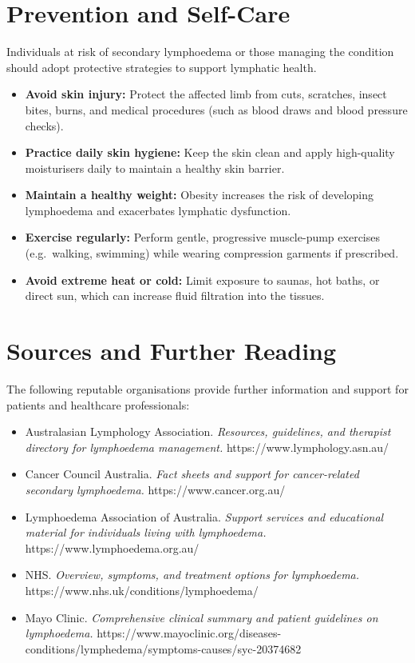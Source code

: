 \section*{Prevention and Self-Care}
Individuals at risk of secondary lymphoedema or those managing the condition should adopt protective strategies to support lymphatic health.
\begin{itemize}
    \item \textbf{Avoid skin injury:} Protect the affected limb from cuts, scratches, insect bites, burns, and medical procedures (such as blood draws and blood pressure checks).
    \item \textbf{Practice daily skin hygiene:} Keep the skin clean and apply high-quality moisturisers daily to maintain a healthy skin barrier.
    \item \textbf{Maintain a healthy weight:} Obesity increases the risk of developing lymphoedema and exacerbates lymphatic dysfunction.
    \item \textbf{Exercise regularly:} Perform gentle, progressive muscle-pump exercises (e.g.\ walking, swimming) while wearing compression garments if prescribed.
    \item \textbf{Avoid extreme heat or cold:} Limit exposure to saunas, hot baths, or direct sun, which can increase fluid filtration into the tissues.
\end{itemize}

\section*{Sources and Further Reading}
The following reputable organisations provide further information and support for patients and healthcare professionals:
\begin{itemize}
    \item Australasian Lymphology Association. \textit{Resources, guidelines, and therapist directory for lymphoedema management.} https://www.lymphology.asn.au/
    \item Cancer Council Australia. \textit{Fact sheets and support for cancer-related secondary lymphoedema.} https://www.cancer.org.au/
    \item Lymphoedema Association of Australia. \textit{Support services and educational material for individuals living with lymphoedema.} https://www.lymphoedema.org.au/
    \item NHS. \textit{Overview, symptoms, and treatment options for lymphoedema.} https://www.nhs.uk/conditions/lymphoedema/
    \item Mayo Clinic. \textit{Comprehensive clinical summary and patient guidelines on lymphoedema.} https://www.mayoclinic.org/diseases-conditions/lymphedema/symptoms-causes/syc-20374682
\end{itemize}
